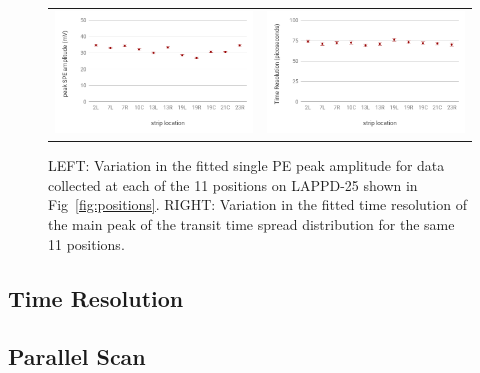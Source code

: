 \documentclass[preprint,12pt]{elsarticle}
\begin{document}
\begin{figure}
	\centering
        \begin{tabular}{l l}
                \includegraphics[width=0.48\linewidth]{plots/SinglePEAmplitudePeak_notitle} &
                \includegraphics[width=0.48\linewidth]{plots/SinglePETimeResolution_notitle}\\
         \end{tabular}  
       \caption{LEFT: Variation in the fitted single PE peak amplitude for data collected at each of the 11 positions on LAPPD-25 shown in Fig~\ref{fig:positions}. RIGHT: Variation in the fitted time resolution of the main peak of the transit time spread distribution for the same 11 positions.}
	\label{fig:amp}
\end{figure}


\subsection{Time Resolution}


\subsection{Parallel Scan}
\end{document}
